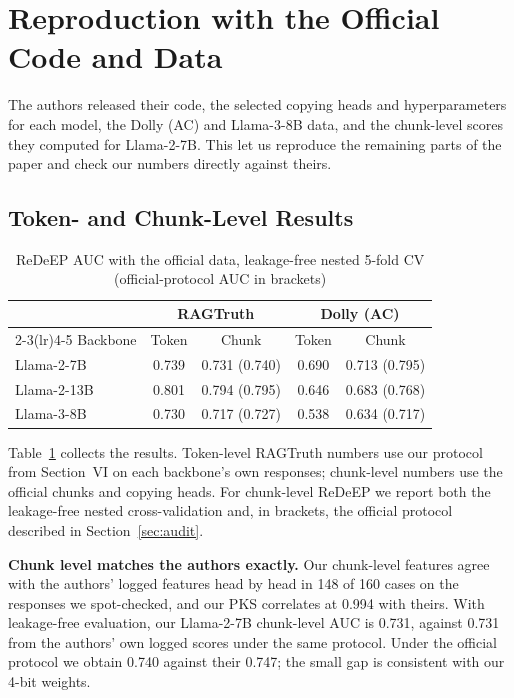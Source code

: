 \documentclass[conference]{IEEEtran}
\begin{document}
\section{Reproduction with the Official Code and Data}
\label{sec:official}
The authors released their code, the selected copying heads and hyperparameters for each model, the Dolly (AC) and Llama-3-8B data, and the chunk-level scores they computed for Llama-2-7B. This let us reproduce the remaining parts of the paper and check our numbers directly against theirs.

\subsection{Token- and Chunk-Level Results}
\begin{table}[t]
\caption{ReDeEP AUC with the official data, leakage-free nested 5-fold CV (official-protocol AUC in brackets)}
\label{tab:official}
\centering\footnotesize
\setlength{\tabcolsep}{2.5pt}
\begin{tabular}{@{}lcccc@{}}
\toprule
& \multicolumn{2}{c}{RAGTruth} & \multicolumn{2}{c}{Dolly (AC)} \\
\cmidrule(lr){2-3}\cmidrule(lr){4-5}
Backbone & Token & Chunk & Token & Chunk \\
\midrule
Llama-2-7B & 0.739 & 0.731 (0.740) & 0.690 & 0.713 (0.795) \\
Llama-2-13B & 0.801 & 0.794 (0.795) & 0.646 & 0.683 (0.768) \\
Llama-3-8B & 0.730 & 0.717 (0.727) & 0.538 & 0.634 (0.717) \\
\bottomrule
\end{tabular}
\end{table}

Table~\ref{tab:official} collects the results. Token-level RAGTruth numbers use our protocol from Section~VI on each backbone's own responses; chunk-level numbers use the official chunks and copying heads. For chunk-level ReDeEP we report both the leakage-free nested cross-validation and, in brackets, the official protocol described in Section~\ref{sec:audit}.

\textbf{Chunk level matches the authors exactly.} Our chunk-level features agree with the authors' logged features head by head in 148 of 160 cases on the responses we spot-checked, and our PKS correlates at 0.994 with theirs. With leakage-free evaluation, our Llama-2-7B chunk-level AUC is 0.731, against 0.731 from the authors' own logged scores under the same protocol. Under the official protocol we obtain 0.740 against their 0.747; the small gap is consistent with our 4-bit weights.
\end{document}

